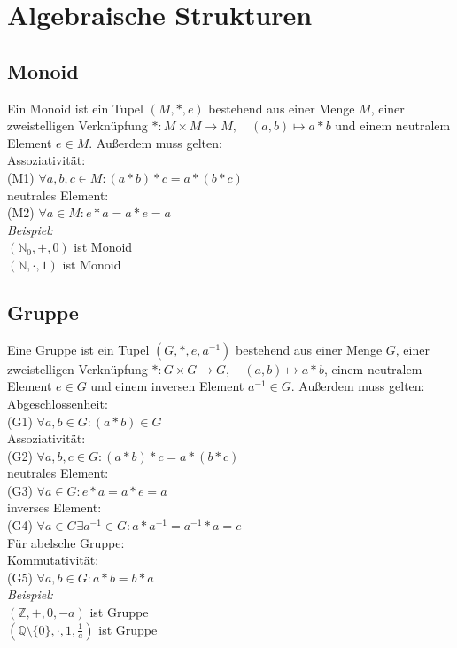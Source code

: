 \section{Algebraische Strukturen}
\subsection*{Monoid}
Ein Monoid ist ein Tupel $(M,*,e)$ bestehend aus einer Menge $M$, einer zweistelligen
Verknüpfung $*:M\times M\to M,\quad (a,b)\mapsto a*b$ und einem neutralem Element $e\in M$.
Außerdem muss gelten:\\
Assoziativität:\\
(M1) $\forall a,b,c\in M:(a*b)*c=a*(b*c)$\\
neutrales Element:\\
(M2) $\forall a\in M:e*a=a*e=a$\\
\emph{Beispiel:}\\
$(\mathbb{N}_0,+,0)$ ist Monoid\\
$(\mathbb{N},\cdot,1)$ ist Monoid
\subsection*{Gruppe}
Eine Gruppe ist ein Tupel $(G,*,e,a^{-1})$ bestehend aus einer Menge $G$, einer zweistelligen Verknüpfung $*:G\times G\to G,\quad (a,b)\mapsto a*b$, einem neutralem Element $e\in G$ und einem inversen Element $a^{-1}\in G$.
Außerdem muss gelten:\\
Abgeschlossenheit:\\
(G1) $\forall a,b\in G:(a*b)\in G$\\
Assoziativität:\\
(G2) $\forall a,b,c\in G:(a*b)*c=a*(b*c)$\\
neutrales Element:\\
(G3) $\forall a\in G:e*a=a*e=a$\\
inverses Element:\\
(G4) $\forall a\in G\exists a^{-1}\in G:a*a^{-1}=a^{-1}*a=e$\\
Für abelsche Gruppe:\\
Kommutativität:\\
(G5) $\forall a,b\in G:a*b=b*a$\\
\emph{Beispiel:}\\
$(\mathbb{Z},+,0,-a)$ ist Gruppe\\
$(\mathbb{Q}\setminus\{0\},\cdot,1,\frac{1}{a})$ ist Gruppe
